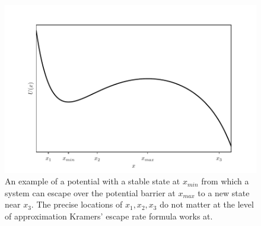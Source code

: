 \begin{figure}
  \centering
  \includegraphics[width=\textwidth,keepaspectratio]{potential_to_escape}
  \caption[Escape from potential well]{An example of a potential with a stable state at $x_{min}$ from which a system can escape over the potential barrier at
    $x_{max}$ to a new state near $x_3$. The precise locations of $x_1,x_2,x_3$ do not matter at the level of approximation Kramers' escape rate formula works at.}
  \label{fig:potential_to_escape}
\end{figure}

